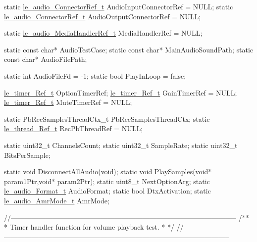 \begin{DoxyCodeInclude}
\textcolor{keyword}{static} \hyperlink{le__audio__interface_8h_ab819480f4ce3f36e62b6a4e327668304}{le\_audio\_ConnectorRef\_t} AudioInputConnectorRef = NULL;
\textcolor{keyword}{static} \hyperlink{le__audio__interface_8h_ab819480f4ce3f36e62b6a4e327668304}{le\_audio\_ConnectorRef\_t} AudioOutputConnectorRef = NULL;

\textcolor{keyword}{static} \hyperlink{le__audio__interface_8h_a390b011cbb6f745c46e861d315af0bbe}{le\_audio\_MediaHandlerRef\_t} MediaHandlerRef = NULL;

\textcolor{keyword}{static} \textcolor{keyword}{const} \textcolor{keywordtype}{char}* AudioTestCase;
\textcolor{keyword}{static} \textcolor{keyword}{const} \textcolor{keywordtype}{char}* MainAudioSoundPath;
\textcolor{keyword}{static} \textcolor{keyword}{const} \textcolor{keywordtype}{char}* AudioFilePath;

\textcolor{keyword}{static} \textcolor{keywordtype}{int}   AudioFileFd = -1;
\textcolor{keyword}{static} \textcolor{keywordtype}{bool} PlayInLoop = \textcolor{keyword}{false};

\hyperlink{le__timer_8h_a763fa6992488cdce3b5a820817094838}{le\_timer\_Ref\_t} OptionTimerRef;
\hyperlink{le__timer_8h_a763fa6992488cdce3b5a820817094838}{le\_timer\_Ref\_t}  GainTimerRef = NULL;
\hyperlink{le__timer_8h_a763fa6992488cdce3b5a820817094838}{le\_timer\_Ref\_t}  MuteTimerRef = NULL;

\textcolor{keyword}{static} PbRecSamplesThreadCtx\_t PbRecSamplesThreadCtx;
\textcolor{keyword}{static} \hyperlink{le__thread_8h_a32121104c6b4ca39008eb79a4d6862f2}{le\_thread\_Ref\_t} RecPbThreadRef = NULL;

\textcolor{keyword}{static} uint32\_t ChannelsCount;
\textcolor{keyword}{static} uint32\_t SampleRate;
\textcolor{keyword}{static} uint32\_t BitsPerSample;

\textcolor{keyword}{static} \textcolor{keywordtype}{void} DisconnectAllAudio(\textcolor{keywordtype}{void});
\textcolor{keyword}{static} \textcolor{keywordtype}{void} PlaySamples(\textcolor{keywordtype}{void}* param1Ptr,\textcolor{keywordtype}{void}* param2Ptr);
\textcolor{keyword}{static} uint8\_t NextOptionArg;
\textcolor{keyword}{static} \hyperlink{le__audio__interface_8h_a0ad2f5012ed700af1892f82e4af5989d}{le\_audio\_Format\_t} AudioFormat;
\textcolor{keyword}{static} \textcolor{keywordtype}{bool} DtxActivation;
\textcolor{keyword}{static} \hyperlink{le__audio__interface_8h_accd7fae61b50dcd68bf722e243bc5cb7}{le\_audio\_AmrMode\_t} AmrMode;


\textcolor{comment}{//--------------------------------------------------------------------------------------------------}\textcolor{comment}{}
\textcolor{comment}{/**}
\textcolor{comment}{ * Timer handler function for volume playback test.}
\textcolor{comment}{ *}
\textcolor{comment}{ */}
\textcolor{comment}{//--------------------------------------------------------------------------------------------------}


\end{DoxyCodeInclude}
